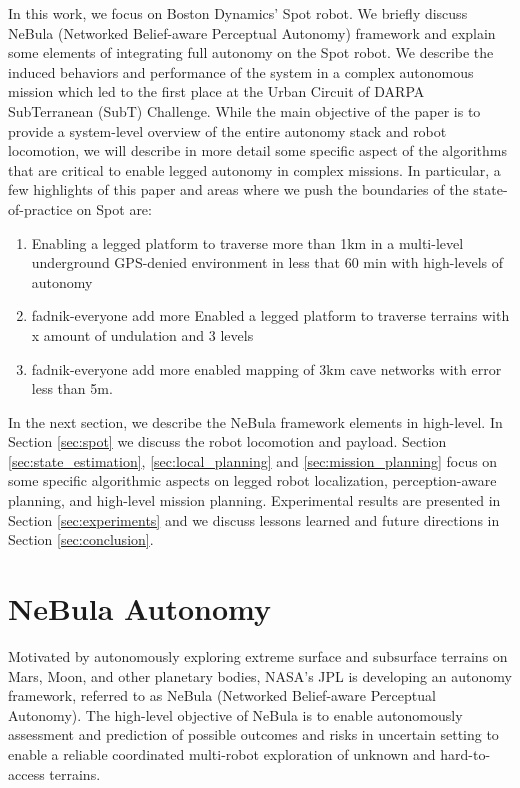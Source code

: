 \documentclass[a4paper, 10pt, conference]{ieeeconf}      %
\newcommand{\ph}[1]{{\textbf{#1}:}} %
\newcommand{\todo}[1]{{\color{red} #1 }} %
\newcommand{\inst}[1]{{\color{orange} #1 }} %
\begin{document}
In this work, we focus on Boston Dynamics' Spot robot. We briefly discuss NeBula (Networked Belief-aware Perceptual Autonomy) framework and explain some elements of integrating full autonomy on the Spot robot. We describe the induced behaviors and performance of the system in a complex autonomous mission which led to the first place at the Urban Circuit of DARPA SubTerranean (SubT) Challenge. While the main objective of the paper is to provide a system-level overview of the entire autonomy stack and robot locomotion, we will describe in more detail some specific aspect of the algorithms that are critical to enable legged autonomy in complex missions. In particular, a few highlights of this paper and areas where we push the boundaries of the state-of-practice on Spot are:
\begin{enumerate}
    \item Enabling a legged platform to traverse more than 1km in a multi-level underground GPS-denied environment in less that 60 min with high-levels of autonomy
    \item \todo{fadnik-everyone} \inst{add more} Enabled a legged platform to traverse terrains with x amount of undulation and 3 levels
    \item \todo{fadnik-everyone} \inst{add more} enabled mapping of 3km cave networks with error less than 5m.
\end{enumerate}


In the next section, we describe the NeBula framework elements in high-level. In Section \ref{sec:spot} we discuss the robot locomotion and payload. Section \ref{sec:state_estimation}, \ref{sec:local_planning} and \ref{sec:mission_planning} focus on some specific algorithmic aspects on legged robot localization, perception-aware planning, and high-level mission planning. Experimental results are presented in Section \ref{sec:experiments} and we discuss lessons learned and future directions in Section \ref{sec:conclusion}.

\section{NeBula Autonomy}\label{sec:nebula}
Motivated by autonomously exploring extreme surface and subsurface terrains on Mars, Moon, and other planetary bodies, NASA's JPL is developing an autonomy framework, referred to as NeBula (Networked Belief-aware Perceptual Autonomy). The high-level objective of NeBula is to enable autonomously assessment and prediction of possible outcomes and risks in uncertain setting to enable a reliable coordinated multi-robot exploration of unknown and hard-to-access terrains.
\end{document}
